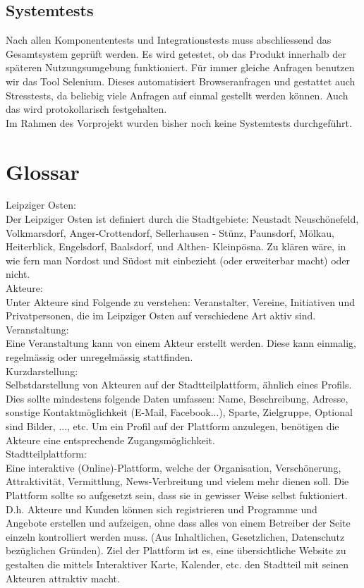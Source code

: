 \documentclass{swp}
\begin{document}
\subsection{Systemtests}
Nach allen Komponententests und Integrationstests muss abschlie{ss}end das Gesamtsystem gepr\"uft werden. Es wird getestet, ob das Produkt innerhalb der sp\"ateren Nutzungsumgebung funktioniert. F\"ur immer gleiche Anfragen benutzen wir das Tool \glqq Selenium\grqq{}. Dieses automatisiert Browseranfragen und gestattet auch Stresstests, da beliebig viele Anfragen auf einmal gestellt werden k\"onnen. Auch das wird protokollarisch festgehalten.\\
Im Rahmen des Vorprojekt wurden bisher noch keine Systemtests durchgef\"uhrt.

\section{Glossar}
Leipziger Osten:\\Der Leipziger Osten ist definiert durch die Stadtgebiete: Neustadt Neusch\"onefeld, Volkmarsdorf, Anger-Crottendorf, Sellerhausen - St\"unz, Paunsdorf, M\"olkau, Heiterblick, Engelsdorf, Baalsdorf, und Althen- Kleinp\"osna. Zu kl\"aren w\"are, in wie fern man Nordost und S\"udost mit einbezieht (oder erweiterbar macht) oder nicht.\\

Akteure: \\Unter Akteure sind Folgende zu verstehen: Veranstalter, Vereine, Initiativen und Privatpersonen, die im Leipziger Osten auf verschiedene Art aktiv sind.\\

Veranstaltung:\\Eine Veranstaltung kann von einem Akteur erstellt werden. Diese kann einmalig, regelm\"a{ss}ig oder unregelm\"a{ss}ig stattfinden.\\

Kurzdarstellung: \\Selbstdarstellung von Akteuren auf der Stadtteilplattform, \"ahnlich eines Profils. Dies sollte mindestens folgende Daten umfassen: Name, Beschreibung, Adresse, sonstige Kontaktm\"oglichkeit (E-Mail, Facebook...), Sparte, Zielgruppe, Optional sind Bilder, ..., etc. Um ein Profil auf der Plattform anzulegen, ben\"otigen die Akteure eine entsprechende Zugangsm\"oglichkeit.\\

Stadtteilplattform: \\Eine interaktive (Online)-Plattform, welche der Organisation, Versch\"onerung, Attraktivit\"at, Vermittlung, \glqq News-Verbreitung\grqq{} und vielem mehr dienen soll. Die Plattform sollte so aufgesetzt sein, dass sie in gewisser Weise selbst fuktioniert. D.h. Akteure und Kunden k\"onnen sich registrieren und Programme und Angebote erstellen und aufzeigen, ohne dass alles von einem Betreiber der Seite einzeln kontrolliert werden muss. (Aus Inhaltlichen, Gesetzlichen, Datenschutz bez\"uglichen Gr\"unden). Ziel der Plattform ist es, eine \"ubersichtliche Website zu gestalten die mittels Interaktiver Karte, Kalender, etc. den Stadtteil mit seinen Akteuren attraktiv macht.
\end{document}
